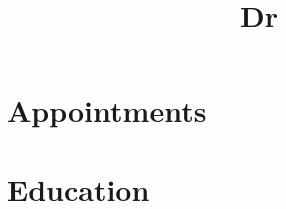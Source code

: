 \documentclass[11pt,a4paper]{article}
\title{Dr}
\begin{document}
\maketitle

\section*{Appointments}%


\section*{Education}%

 
\begin{publications}
%
%
%
%
%
%
%  
%
%
%
%
\end{publications}
\end{document}
